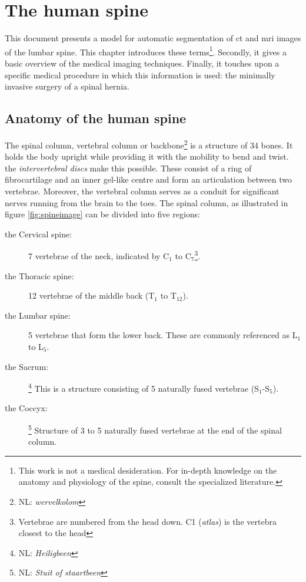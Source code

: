 \chapter{The human spine}\thispagestyle{empty}
\par{
    This document presents a model for automatic segmentation of \acrfull{ct} and \acrfull{mri} images of the lumbar spine.
    This chapter introduces these terms\footnote{This work is not a medical desideration. For in-depth knowledge on the anatomy and physiology of the spine, consult the specialized literature.}.
    Secondly, it gives a basic overview of the medical imaging techniques. 
    Finally, it touches upon a specific medical procedure in which this information is used: the minimally invasive surgery of a spinal hernia.
}
\section{Anatomy of the human spine}

\par{
    The spinal column, vertebral column or backbone\footnote{NL: \textit{wervelkolom}} is a structure of 34 bones. 
    It holds the body upright while providing it with the mobility to bend and twist.
    the \textit{intervertebral discs} make this possible. These consist of a ring of fibrocartilage and an inner gel-like centre and form an articulation between two vertebrae.
    Moreover, the vertebral column serves as a conduit for significant nerves running from the brain to the toes.
    The spinal column, as illustrated in figure \ref{fig:spineimage} can be divided into five regions:
}
\begin{description}
    \item[the Cervical spine:] 7 vertebrae of the neck, indicated by C$_1$ to C$_7$\footnote{Vertebrae are numbered from the head down. C1 (\textit{atlas}) is the vertebra closest to the head}.
    \item[the Thoracic spine:] 12 vertebrae of the middle back (T$_1$ to T$_{12}$).
    \item[the Lumbar spine:] 5 vertebrae that form the lower back. These are commonly referenced as L$_1$ to L$_5$.
    \item[the Sacrum:]\footnote{NL: \textit{Heiligbeen}} This is a structure consisting of 5 naturally fused vertebrae (S$_1$-S$_5$).
    \item[the Coccyx:]\footnote{NL: \textit{Stuit of staartbeen}} Structure of 3 to 5 naturally fused vertebrae at the end of the spinal column.
\end{description}


